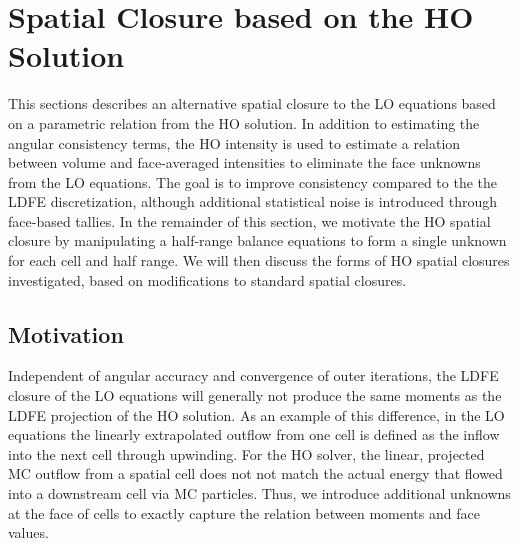 
\section{Spatial Closure based on the HO Solution}
\label{sec:spat_clos}

This sections describes an alternative spatial closure to the LO equations based on 
a parametric relation from the HO solution. In addition to estimating the angular
consistency terms, the HO intensity is used to estimate a relation between volume and face-averaged
intensities to eliminate the face unknowns from the LO equations. 
 The goal is to improve consistency compared to the the LDFE discretization, although
additional statistical noise is introduced through face-based tallies.
In the remainder of
this section, we motivate the HO spatial closure by manipulating a half-range balance
equations to form a single unknown for each cell and half range.  We will then discuss
the forms of HO spatial closures investigated, based on modifications to standard spatial closures.

\subsection{Motivation}

Independent of angular accuracy and convergence of outer iterations, the LDFE closure of the LO equations will generally
not produce the same moments as the LDFE projection of the HO solution.  As an example of
this difference, in the LO equations the linearly extrapolated outflow from one cell is defined as the
inflow into the next cell through upwinding.  For the HO solver, the linear,
projected MC outflow from a spatial cell does not not match the actual energy
that flowed into a downstream cell via MC particles.  Thus, we introduce additional
unknowns at the face of cells to exactly capture the relation between moments and face
values.

